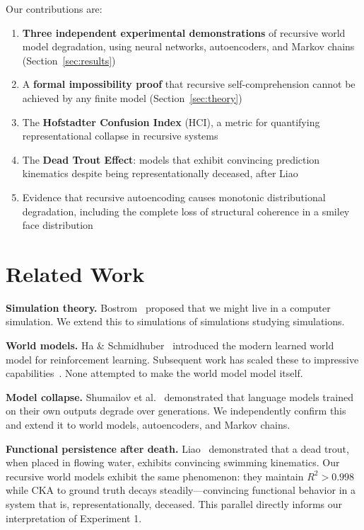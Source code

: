 \documentclass[11pt, twocolumn]{article}
\begin{document}
Our contributions are:
\begin{enumerate}[nosep]
    \item \textbf{Three independent experimental demonstrations} of recursive world model degradation, using neural networks, autoencoders, and Markov chains (Section~\ref{sec:results})
    \item A \textbf{formal impossibility proof} that recursive self-comprehension cannot be achieved by any finite model (Section~\ref{sec:theory})
    \item The \textbf{Hofstadter Confusion Index} (HCI), a metric for quantifying representational collapse in recursive systems
    \item The \textbf{Dead Trout Effect}: models that exhibit convincing prediction kinematics despite being representationally deceased, after Liao~\cite{liao2024}
    \item Evidence that recursive autoencoding causes monotonic distributional degradation, including the complete loss of structural coherence in a smiley face distribution
\end{enumerate}

\section{Related Work}

\textbf{Simulation theory.} Bostrom~\cite{bostrom2003} proposed that we might live in a computer simulation. We extend this to simulations of simulations studying simulations.

\textbf{World models.} Ha \& Schmidhuber~\cite{ha2018world} introduced the modern learned world model for reinforcement learning. Subsequent work has scaled these to impressive capabilities~\cite{hafner2020dream, micheli2023transformers}. None attempted to make the world model model itself.

\textbf{Model collapse.} Shumailov et al.~\cite{shumailov2024} demonstrated that language models trained on their own outputs degrade over generations. We independently confirm this and extend it to world models, autoencoders, and Markov chains.

\textbf{Functional persistence after death.} Liao~\cite{liao2024} demonstrated that a dead trout, when placed in flowing water, exhibits convincing swimming kinematics. Our recursive world models exhibit the same phenomenon: they maintain $R^2 > 0.998$ while CKA to ground truth decays steadily---convincing functional behavior in a system that is, representationally, deceased. This parallel directly informs our interpretation of Experiment 1.
\end{document}
